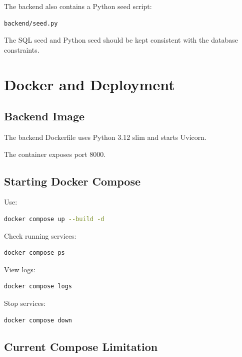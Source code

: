 \documentclass[12pt,a4paper]{article}
\begin{document}
The backend also contains a Python seed script:

\begin{lstlisting}
backend/seed.py
\end{lstlisting}

The SQL seed and Python seed should be kept consistent with the
database constraints.


\section{Docker and Deployment}

\subsection{Backend Image}

The backend Dockerfile uses Python 3.12 slim and starts Uvicorn.

The container exposes port 8000.

\subsection{Starting Docker Compose}

Use:

\begin{lstlisting}[language=bash]
docker compose up --build -d
\end{lstlisting}

Check running services:

\begin{lstlisting}[language=bash]
docker compose ps
\end{lstlisting}

View logs:

\begin{lstlisting}[language=bash]
docker compose logs
\end{lstlisting}

Stop services:

\begin{lstlisting}[language=bash]
docker compose down
\end{lstlisting}

\subsection{Current Compose Limitation}
\end{document}
